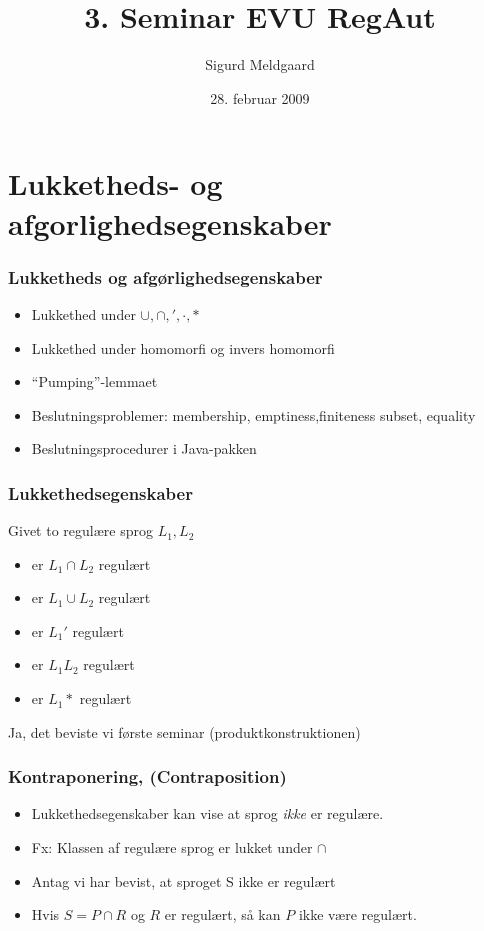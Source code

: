 \documentclass{beamer}
\title{3. Seminar EVU RegAut}
\author{Sigurd Meldgaard}
\date{28. februar 2009}
\begin{document}
\maketitle
\section{Lukketheds- og afgorlighedsegenskaber}

\begin{frame}
  \frametitle{Lukketheds og afgørlighedsegenskaber}
  \begin{itemize}
  \item Lukkethed under $\cup, \cap, ', \cdot, *$ 
  \item Lukkethed under homomorfi og invers 
    homomorfi 
  \item ``Pumping''-lemmaet 
  \item Beslutningsproblemer: membership,  
    emptiness,finiteness subset, equality 
  \item Beslutningsprocedurer i Java-pakken
  \end{itemize}
\end{frame}

\begin{frame}
\frametitle{Lukkethedsegenskaber}
Givet to regulære sprog $L_1, L_2$
\begin{itemize}[<+->]
\item er $L_1 \cap L_2$ regulært
\item er $L_1 \cup L_2$ regulært
\item er $L_1'$ regulært
\item er $L_1L_2$ regulært
\item er $L_1*$ regulært
\end{itemize}
Ja, det beviste vi første seminar (produktkonstruktionen)
\end{frame}

\begin{frame}
\frametitle{Kontraponering, (Contraposition)}
\begin{itemize}[<+->]
\item Lukkethedsegenskaber kan vise at sprog \emph{ikke} er regulære.
\item Fx: Klassen af regulære sprog er lukket under $\cap$
\item Antag vi har bevist, at sproget S ikke er  
regulært 
\item Hvis $S = P \cap R$ og $R$ er regulært, så kan  
$P$ ikke være regulært.
\end{itemize}
\end{frame}
\end{document}
